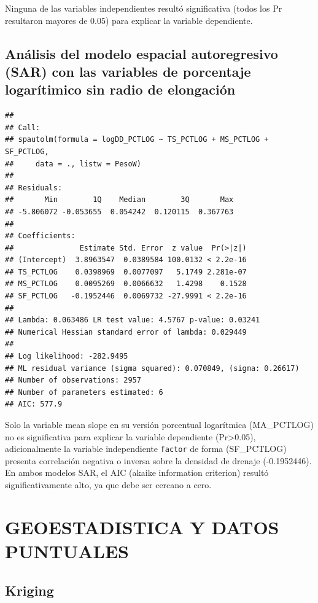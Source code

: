 \documentclass[11pt,]{article}
\begin{document}
Ninguna de las variables independientes resultó significativa (todos los
Pr resultaron mayores de 0.05) para explicar la variable dependiente.

\subsection{Análisis del modelo espacial autoregresivo (SAR) con las
variables de porcentaje logarítimico sin radio de
elongación}\label{anuxe1lisis-del-modelo-espacial-autoregresivo-sar-con-las-variables-de-porcentaje-logaruxedtimico-sin-radio-de-elongaciuxf3n}

\begin{verbatim}
## 
## Call: 
## spautolm(formula = logDD_PCTLOG ~ TS_PCTLOG + MS_PCTLOG + SF_PCTLOG, 
##     data = ., listw = PesoW)
## 
## Residuals:
##       Min        1Q    Median        3Q       Max 
## -5.806072 -0.053655  0.054242  0.120115  0.367763 
## 
## Coefficients: 
##               Estimate Std. Error  z value  Pr(>|z|)
## (Intercept)  3.8963547  0.0389584 100.0132 < 2.2e-16
## TS_PCTLOG    0.0398969  0.0077097   5.1749 2.281e-07
## MS_PCTLOG    0.0095269  0.0066632   1.4298    0.1528
## SF_PCTLOG   -0.1952446  0.0069732 -27.9991 < 2.2e-16
## 
## Lambda: 0.063486 LR test value: 4.5767 p-value: 0.03241 
## Numerical Hessian standard error of lambda: 0.029449 
## 
## Log likelihood: -282.9495 
## ML residual variance (sigma squared): 0.070849, (sigma: 0.26617)
## Number of observations: 2957 
## Number of parameters estimated: 6 
## AIC: 577.9
\end{verbatim}

Solo la variable mean slope en su versión porcentual logarítmica
(MA\_PCTLOG) no es significativa para explicar la variable dependiente
(Pr\textgreater{}0.05), adicionalmente la variable independiente
\texttt{factor} de forma (SF\_PCTLOG) presenta correlación negativa o
inversa sobre la densidad de drenaje (-0.1952446). En ambos modelos SAR,
el AIC (akaike information criterion) resultó significativamente alto,
ya que debe ser cercano a cero.

\section{GEOESTADISTICA Y DATOS
PUNTUALES}\label{geoestadistica-y-datos-puntuales}

\subsection{Kriging}\label{kriging}
\end{document}
